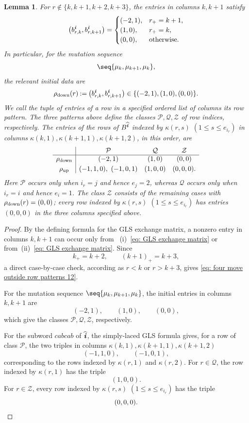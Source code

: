 \documentclass[12pt, leqno]{amsart}
\numberwithin{equation}{section}
\theoremstyle{plain}
\newtheorem{lemma}{Lemma}[section]
\theoremstyle{definition}
\renewcommand{\le}{\leqslant}
\newcommand{\seteq}{\mathbin{:=}}
\newcommand{\ii}{ \textbf{\textit{i}}}
\newcommand{\hii}{{\widehat{\ii}}}
\newcommand{\calP}{\mathcal{P}}
\newcommand{\calQ}{\mathcal{Q}}
\newcommand{\calZ}{\mathcal{Z}}
\begin{document}
\begin{lemma}\label{lem: GLS four move outside rows 12}
For $r\notin\{k,k+1,k+2,k+3\}$, the entries in columns $k,k+1$ satisfy
\begin{equation}\label{eq: four move outside row patterns 12}
\bigl(b^\ii_{r,k},b^\ii_{r,k+1}\bigr)=
\begin{cases}
(-2,1),&r_+=k+1,\\
(1,0),&r_+=k,\\
(0,0),&\text{otherwise}.
\end{cases}
\end{equation}
In particular, for the mutation sequence
\[
\seq{\mu_k,\mu_{k+1},\mu_k},
\]
the relevant initial data are
\[
\rho_{\rm down}(r) \seteq  \bigl(b^\ii_{r,k},b^\ii_{r,k+1}\bigr)   \in  \{(-2,1),(1,0),(0,0)\}.
\]
We call the tuple of entries of a row in a specified ordered list
of columns its \emph{row pattern}. The three patterns above define
the classes $\calP,\calQ,\calZ$ of row indices, respectively.
The entries of  the rows of $B^\hii$ indexed by $\kappa(r,s)$ $(1\le s\le e_{i_r})$ in columns $\kappa(k,1),\kappa(k+1,1),\kappa(k+1,2)$, in this order, are
\begin{equation}\label{eq: four move active row data 12}
\begin{array}{c|ccc}
 & \calP & \calQ & \calZ\\ \hline
\rho_{\rm down}  & (-2,1) & (1,0) & (0,0)\\[1mm]
\rho_{\rm up}  & (-1,1,0),\ (-1,0,1)  & (1,0,0)  & (0,0,0).
\end{array}
\end{equation}
Here $\calP$ occurs only when $i_r=j$ and hence $e_j=2$, whereas $\calQ$ occurs only when $i_r=i$ and hence $e_i=1$.
The class $\calZ$ consists of the remaining cases with
$\rho_{\rm down}(r)=(0,0)$;  every row indexed by $\kappa(r,s)$ $(1\le s\le e_{i_r})$ has entries $(0,0,0)$ in the three columns specified above. \end{lemma}

\begin{proof}
By the defining formula for the GLS exchange matrix, a nonzero entry
in columns $k,k+1$ can occur only from ~{\rm (i)}~\eqref{eq: GLS exchange matrix} or from~{\rm (ii)}~\eqref{eq: GLS exchange matrix}. Since
\[
k_+=k+2, \qquad (k+1)_+=k+3,
\]
a direct case-by-case check, according as $r<k$ or $r>k+3$, gives
\eqref{eq: four move outside row patterns 12}.

For the mutation sequence $\seq{\mu_k,\mu_{k+1},\mu_k}$,
the initial entries in columns $k,k+1$ are \[
(-2,1),\qquad (1,0),\qquad (0,0),
\]
which give the classes $\calP,\calQ,\calZ$, respectively.

  For the subword $cabcab$ of $\hii$,  the simply-laced GLS formula gives,
for a row of class $\calP$, the two triples in columns $\kappa(k,1),\kappa(k+1,1),\kappa(k+1,2)$ \[
(-1,1,0),  \qquad  (-1,0,1),
\]
corresponding to  the rows indexed by $\kappa(r,1)$ and $\kappa(r,2)$.  For $r\in\calQ$, the row indexed by $\kappa(r,1)$ has the triple \[
(1,0,0).
\]
 For $r\in\calZ$, every row indexed by $\kappa(r,s)$ $(1\le s\le e_{i_r})$ has the triple \[
(0,0,0). \qedhere
\]
\end{proof}
\end{document}
